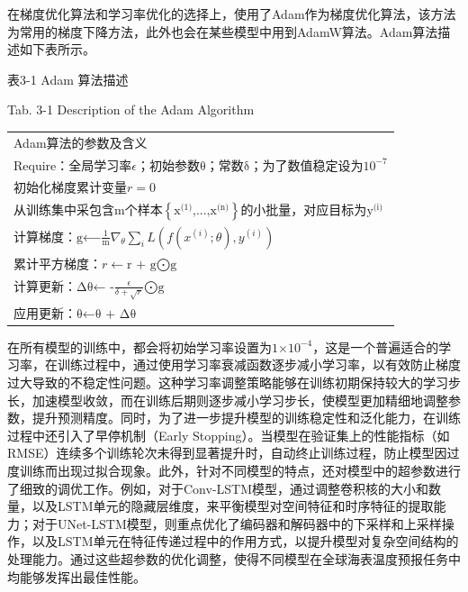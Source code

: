 \documentclass[
  12pt,
]{article}
\newcounter{none} %
\begin{document}
在梯度优化算法和学习率优化的选择上，使用了Adam作为梯度优化算法，该方法为常用的梯度下降方法，此外也会在某些模型中用到AdamW算法。Adam算法描述如下表所示。

表3-1 Adam 算法描述

Tab. 3-1 Description of the Adam Algorithm

{\def\LTcaptype{none} %
\begin{longtable}[]{@{}
  >{\centering\arraybackslash}p{}@{}}
\toprule\noalign{}
\endhead
\bottomrule\noalign{}
\endlastfoot
Adam算法的参数及含义 \\
Require：全局学习率\(\epsilon\)；初始参数\(\text{θ}\)；常数\(\text{δ}\)；为了数值稳定设为\(10^{- 7}\) \\
初始化梯度累计变量\(r = 0\) \\
从训练集中采包含m个样本\(\left\{ \text{x}^{\text{(1)}}\text{,...,}\text{x}^{\text{(n)}} \right\}\)的小批量，对应目标为\(\text{y}^{\text{(i)}}\) \\
计算梯度：\(\text{g⟵}\frac{\text{1}}{\text{m}}\nabla_{\theta}\sum_{i}^{}{L(f(x^{(i)};\theta),y^{(i)})}\) \\
累计平方梯度：\(r \longleftarrow \text{r + g⨀g}\) \\
计算更新：\(\mathrm{\Delta}\text{θ← -}\frac{\epsilon}{\delta + \sqrt{r}}\text{⨀g}\) \\
应用更新：\(\text{θ←θ + ∆θ}\) \\
\end{longtable}
}

在所有模型的训练中，都会将初始学习率设置为\(\text{1×}\text{10}^{\text{−4}}\)，这是一个普遍适合的学习率，在训练过程中，通过使用学习率衰减函数逐步减小学习率，以有效防止梯度过大导致的不稳定性问题。这种学习率调整策略能够在训练初期保持较大的学习步长，加速模型收敛，而在训练后期则逐步减小学习步长，使模型更加精细地调整参数，提升预测精度。同时，为了进一步提升模型的训练稳定性和泛化能力，在训练过程中还引入了早停机制（Early
Stopping）。当模型在验证集上的性能指标（如RMSE）连续多个训练轮次未得到显著提升时，自动终止训练过程，防止模型因过度训练而出现过拟合现象。此外，针对不同模型的特点，还对模型中的超参数进行了细致的调优工作。例如，对于Conv-LSTM模型，通过调整卷积核的大小和数量，以及LSTM单元的隐藏层维度，来平衡模型对空间特征和时序特征的提取能力；对于UNet-LSTM模型，则重点优化了编码器和解码器中的下采样和上采样操作，以及LSTM单元在特征传递过程中的作用方式，以提升模型对复杂空间结构的处理能力。通过这些超参数的优化调整，使得不同模型在全球海表温度预报任务中均能够发挥出最佳性能。
\end{document}
